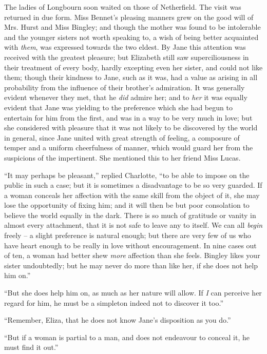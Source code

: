 
The ladies of Longbourn soon waited on those of
Netherfield. The visit was returned in due form. Miss
Bennet’s pleasing manners grew on the good will of Mrs.
Hurst and Miss Bingley; and though the mother was
found to be intolerable and the younger sisters not worth
speaking to, a wish of being better acquainted with \textit{them},
was expressed towards the two eldest. By Jane this
attention was received with the greatest pleasure; but
Elizabeth still saw superciliousness in their treatment of
every body, hardly excepting even her sister, and could
not like them; though their kindness to Jane, such as it
was, had a value as arising in all probability from the
influence of their brother’s admiration. It was generally
evident whenever they met, that he \textit{did} admire her; and
to \textit{her} it was equally evident that Jane was yielding to the
preference which she had begun to entertain for him from
the first, and was in a way to be very much in love; but
she considered with pleasure that it was not likely to be
discovered by the world in general, since Jane united with
great strength of feeling, a composure of temper and a
uniform cheerfulness of manner, which would guard her
from the suspicions of the impertinent. She mentioned
this to her friend Miss Lucas.

“It may perhaps be pleasant,” replied Charlotte, “to
be able to impose on the public in such a case; but it is
sometimes a disadvantage to be so very guarded. If
a woman conceals her affection with the same skill from
the object of it, she may lose the opportunity of fixing
him; and it will then be but poor consolation to believe
the world equally in the dark. There is so much of gratitude
or vanity in almost every attachment, that it is not
safe to leave any to itself. We can all \textit{begin} freely -- a slight
preference is natural enough; but there are very few of
us who have heart enough to be really in love without
encouragement. In nine cases out of ten, a woman had
better shew \textit{more} affection than she feels. Bingley likes
your sister undoubtedly; but he may never do more than
like her, if she does not help him on.”

“But she does help him on, as much as her nature will
allow. If \textit{I} can perceive her regard for him, he must be
a simpleton indeed not to discover it too.”

“Remember, Eliza, that he does not know Jane’s
disposition as you do.”

“But if a woman is partial to a man, and does not
endeavour to conceal it, he must find it out.”

